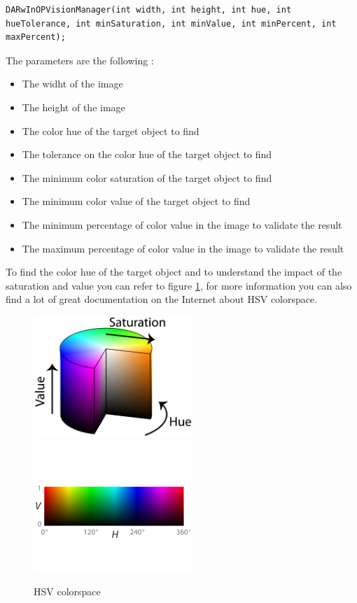 \documentclass[a4paper, 12pt]{article}  		%
\begin{document}
\lstset{language=c++} 
\lstset{commentstyle=\textit} 
\begin{lstlisting} 
DARwInOPVisionManager(int width, int height, int hue, int hueTolerance, int minSaturation, int minValue, int minPercent, int maxPercent);
\end{lstlisting}
The parameters are the following : \\
\begin{itemize}
\item The widht of the image
\item The height of the image
\item The color hue of the target object to find
\item The tolerance on the color hue of the target object to find
\item The minimum color saturation of the target object to find
\item The minimum color value of the target object to find
\item The minimum percentage of color value in the image to validate the result
\item The maximum percentage of color value in the image to validate the result
\end{itemize}

To find the color hue of the target object and to understand the impact of the saturation and value you can refer to figure \ref{HSV}, for more information you can also find a lot of great documentation on the Internet about HSV colorspace.\\ 
\begin{figure}[H]
\begin{center}
\includegraphics[width=6cm]{HSV.png}
\includegraphics[width=6cm]{HV.png}
\caption{HSV colorspace}
\label{HSV}
\end{center}
\end{figure}
\end{document}
